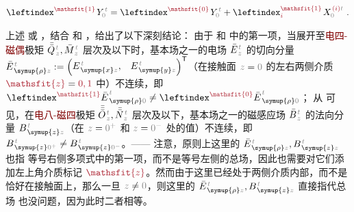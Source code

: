 \begin{align} \label{eq:1BC}
	\leftindex^{\textcolor{Maroon}{\mathsfit{1}}} \;\! Y^{\;\!\mathcolor{gray}{t}}_{\mathcolor{gray}{0}} = \leftindex^{\textcolor{Maroon}{\mathsfit{0}}} \;\! Y^{\;\!\mathcolor{gray}{t}}_{\mathcolor{gray}{0}} + \leftindex^{\textcolor{Maroon}{\mathsfit{1}}}_{\textcolor{Maroon}{i}} \;\! X^{\;\!\textcolor{Maroon}{(i)}\mathcolor{gray}{t}}_{\mathcolor{gray}{0}} ~.
\end{align}

上述  或 ，结合  和 ，给出了以下深刻结论：{\one} 由于  和  中的第一项，当展开至\textcolor{Maroon}{电四-磁偶}极矩 $\bar{\bar{Q}}^{\;\!\mathcolor{gray}{t}}_{\;\!\mathcolor{gray}{z}}, \bar{M}^{\;\!\mathcolor{gray}{t}}_{\;\!\mathcolor{gray}{z}}$ 层次及以下时，基本场之一的电场 $\bar{E}^{\;\!\mathcolor{gray}{t}}_{\;\!\mathcolor{gray}{z}}$ 的切向分量 $\bar{E}^{\;\!\mathcolor{gray}{t}}_{\;\! \symup{\rho} \mathcolor{gray}{z}} := \begin{pmatrix} E^{\;\!\mathcolor{gray}{t}}_{\;\! \symup{x} \mathcolor{gray}{z}}, & E^{\;\!\mathcolor{gray}{t}}_{\;\! \symup{y} \mathcolor{gray}{z}} \end{pmatrix}^\mathsf{T}$（在接触面 $\mathcolor{gray}{z \mathcolor{black}{=} 0}$ 的左右两侧介质 $\textcolor{Maroon}{\mathsfit{z}} = \textcolor{Maroon}{0,1}$ 中）不连续，即 $\leftindex^{\textcolor{Maroon}{\mathsfit{1}}} {\bar{E}}^{\;\!\mathcolor{gray}{t}}_{\;\! \symup{\rho} \mathcolor{gray}{0}} \neq \leftindex^{\textcolor{Maroon}{\mathsfit{0}}} {\bar{E}}^{\;\!\mathcolor{gray}{t}}_{\;\! \symup{\rho} \mathcolor{gray}{0}}$；{\two} 从  可见，在\textcolor{Maroon}{电八-磁四}极矩 $\bar{\bar{\bar{O}}}^{\;\!\mathcolor{gray}{t}}_{\;\!\mathcolor{gray}{z}}, \bar{\bar{N}}^{\;\!\mathcolor{gray}{t}}_{\;\!\mathcolor{gray}{z}}$ 层次及以下，基本场之一的磁感应场 $\bar{B}^{\;\!\mathcolor{gray}{t}}_{\;\!\mathcolor{gray}{z}}$ 的法向分量 $B^{\;\!\mathcolor{gray}{t}}_{\;\! \symup{z} \mathcolor{gray}{z}}$（在 $\mathcolor{gray}{z \mathcolor{black}{=} 0^+}$ 和 $\mathcolor{gray}{z \mathcolor{black}{=} 0^-}$ 处的值）不连续，即 $B^{\;\!\mathcolor{gray}{t}}_{\;\! \symup{z} \mathcolor{gray}{0^+}} \neq B^{\;\!\mathcolor{gray}{t}}_{\;\! \symup{z} \mathcolor{gray}{0^-}}$。—— 注意，原则上这里的 $\bar{E}^{\;\!\mathcolor{gray}{t}}_{\;\! \symup{\rho} \mathcolor{gray}{z}},B^{\;\!\mathcolor{gray}{t}}_{\;\! \symup{z} \mathcolor{gray}{z}}$ 也指  等号右侧多项式中的第一项，而不是等号左侧的总场，因此也需要对它们添加左上角介质标记 $\textcolor{Maroon}{\mathsfit{z}}$。然而由于这里已经处于两侧介质内部，而不是恰好在接触面上，那么一旦 $\mathcolor{gray}{z} \neq \mathcolor{gray}{0}$，则这里的 $\bar{E}^{\;\!\mathcolor{gray}{t}}_{\;\! \symup{\rho} \mathcolor{gray}{z}},B^{\;\!\mathcolor{gray}{t}}_{\;\! \symup{z} \mathcolor{gray}{z}}$ 直接指代总场  也没问题，因为此时二者相等。

